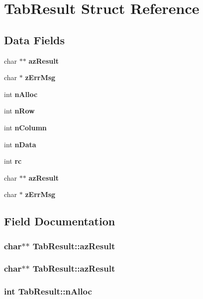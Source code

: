 \section{Tab\-Result Struct Reference}
\label{structTabResult}
\subsection*{Data Fields}
\begin{CompactItemize}
\item 
char $\ast$$\ast$ \bf{az\-Result}
\item 
char $\ast$ \bf{z\-Err\-Msg}
\item 
int \bf{n\-Alloc}
\item 
int \bf{n\-Row}
\item 
int \bf{n\-Column}
\item 
int \bf{n\-Data}
\item 
int \bf{rc}
\item 
char $\ast$$\ast$ \bf{az\-Result}
\item 
char $\ast$ \bf{z\-Err\-Msg}
\end{CompactItemize}


\subsection{Field Documentation}
\subsubsection{\setlength{\rightskip}{0pt plus 5cm}char$\ast$$\ast$ \bf{Tab\-Result::az\-Result}}\label{structTabResult_d6654255a2f09427858520f11e92b978}


\subsubsection{\setlength{\rightskip}{0pt plus 5cm}char$\ast$$\ast$ \bf{Tab\-Result::az\-Result}}\label{structTabResult_d6654255a2f09427858520f11e92b978}


\subsubsection{\setlength{\rightskip}{0pt plus 5cm}int \bf{Tab\-Result::n\-Alloc}}\label{structTabResult_7c891ecab9ade80809362ddd6a29c55b}


